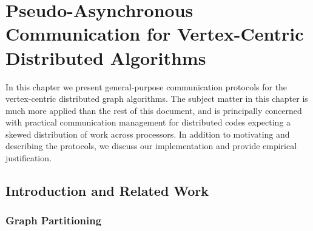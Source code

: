 \documentclass{report}
\begin{document}
\chapter{Pseudo-Asynchronous Communication for Vertex-Centric Distributed Algorithms}
 \label{chap:async}

In this chapter we present general-purpose communication protocols for the vertex-centric distributed graph algorithms. 
The subject matter in this chapter is much more applied than the rest of this document, and is principally concerned with practical communication management for distributed codes expecting a skewed distribution of work across processors.
In addition to motivating and describing the protocols, we discuss our implementation and provide empirical justification.


\section{Introduction and Related Work} \label{async:sec:intro}


\subsection{Graph Partitioning} \label{async:sec:intro:partitioning}
\end{document}
